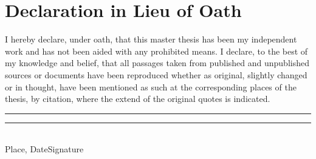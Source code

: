 \label{section:oath}
\section*{\centering Declaration in Lieu of Oath}
\glqq I hereby declare, under oath, that this master thesis has been my independent work and has not been aided with any prohibited means. I declare, to the best of my knowledge and belief, that all passages taken from published and unpublished sources or documents have been reproduced whether as original, slightly changed or in thought, have been mentioned as such at the corresponding places of the thesis, by citation, where the extend of the original quotes is indicated.\grqq\\[5\baselineskip]
\rule{5cm}{0.2pt}\hfill\rule{5cm}{0.2pt}\\
\phantom{Date }Place, Date\hfill Signature\hspace{15mm}




